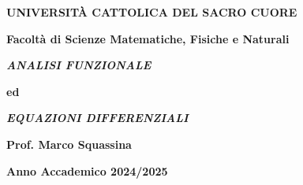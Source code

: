 


	\begin{titlepage}
		\begin{center}
			{\Large \textbf{UNIVERSITÀ CATTOLICA DEL SACRO CUORE}}
			
			\vspace{20 pt}
			
			{\Large \textbf{Facoltà di Scienze Matematiche, Fisiche e Naturali}}
		\end{center}
		\vspace{180 pt}
		\begin{center}
			{\LARGE \textit{\textbf{ANALISI FUNZIONALE}}}
			
			\vspace{20 pt}
			
			{\LARGE \textbf{ed}}
			
			\vspace{20 pt}
			
			{\LARGE \textit{\textbf{EQUAZIONI DIFFERENZIALI}}}
		\end{center}
		\vspace{190 pt}
		\begin{center}
			{\Large \textbf{Prof. Marco Squassina}}
		\end{center}
		
		\vfill
		
		\begin{center}
			{\Large \textbf{Anno Accademico 2024/2025}}
		\end{center}
	\end{titlepage}
	
	\newpage
	\thispagestyle{empty}
	\hfill
	
	\newpage